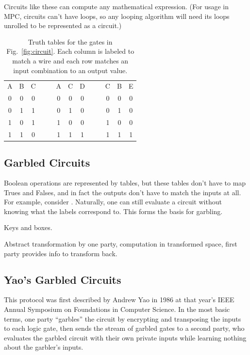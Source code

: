 Circuits like these can compute any mathematical expression. (For usage in MPC, circuits can't have loops, so any looping algorithm will need its loops unrolled to be represented as a circuit.)

\begin{table}[ht]
	\centering
	\begin{tabular}{cc|c   cc   cc|c   cc   cc|c}
		A & B & C   &&&   A & C & D   &&&   C & B & E \\
		\cmidrule{1-3}    \cmidrule{6-8}    \cmidrule{11-13}
		0 & 0 & 0   &&&   0 & 0 & 0   &&&   0 & 0 & 0 \\
		0 & 1 & 1   &&&   0 & 1 & 0   &&&   0 & 1 & 0 \\
		1 & 0 & 1   &&&   1 & 0 & 0   &&&   1 & 0 & 0 \\
		1 & 1 & 0   &&&   1 & 1 & 1   &&&   1 & 1 & 1 \\
	\end{tabular}
	\caption{Truth tables for the gates in Fig.~\ref{fig:circuit}. Each column is labeled to match a wire and each row matches an input combination to an output value.}%
	\label{tab:truth-table}
\end{table}



\subsection{Garbled Circuits}
Boolean operations are represented by tables, but these tables don't have to map Trues and Falses, and in fact the outputs don't have to match the inputs at all. For example, consider . Naturally, one can still evaluate a circuit without knowing what the labels correspond to. This forms the basis for garbling.

Keys and boxes.

Abstract transformation by one party, computation in transformed space, first party provides info to transform back.

\subsection{Yao's Garbled Circuits}
This protocol was first described by Andrew Yao in 1986 at that year's IEEE Annual Symposium on Foundations in Computer Science. In the most basic terms, one party ``garbles'' the circuit by encrypting and transposing the inputs to each logic gate, then sends the stream of garbled gates to a second party, who evaluates the garbled circuit with their own private inputs while learning nothing about the garbler's inputs.

